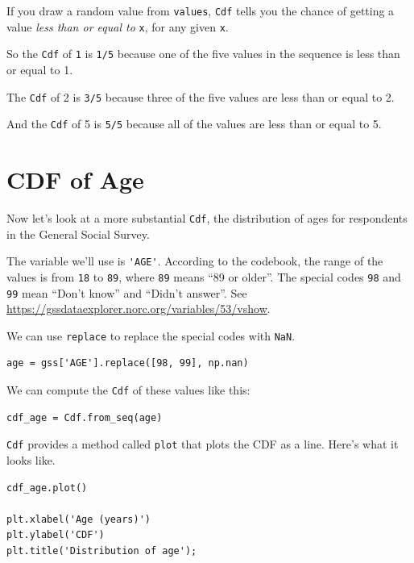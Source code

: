 If you draw a random value from \passthrough{\lstinline!values!},
\passthrough{\lstinline!Cdf!} tells you the chance of getting a value
\emph{less than or equal to} \passthrough{\lstinline!x!}, for any given
\passthrough{\lstinline!x!}.

So the \passthrough{\lstinline!Cdf!} of \passthrough{\lstinline!1!} is
\passthrough{\lstinline!1/5!} because one of the five values in the
sequence is less than or equal to 1.

The \passthrough{\lstinline!Cdf!} of 2 is \passthrough{\lstinline!3/5!}
because three of the five values are less than or equal to 2.

And the \passthrough{\lstinline!Cdf!} of 5 is
\passthrough{\lstinline!5/5!} because all of the values are less than or
equal to 5.

\hypertarget{cdf-of-age}{%
\section{CDF of Age}\label{cdf-of-age}}

Now let's look at a more substantial \passthrough{\lstinline!Cdf!}, the
distribution of ages for respondents in the General Social Survey.

The variable we'll use is \passthrough{\lstinline!'AGE'!}. According to
the codebook, the range of the values is from
\passthrough{\lstinline!18!} to \passthrough{\lstinline!89!}, where
\passthrough{\lstinline!89!} means ``89 or older''. The special codes
\passthrough{\lstinline!98!} and \passthrough{\lstinline!99!} mean
``Don't know'' and ``Didn't answer''. See
\url{https://gssdataexplorer.norc.org/variables/53/vshow}.

We can use \passthrough{\lstinline!replace!} to replace the special
codes with \passthrough{\lstinline!NaN!}.

\begin{lstlisting}[]
age = gss['AGE'].replace([98, 99], np.nan)
\end{lstlisting}

We can compute the \passthrough{\lstinline!Cdf!} of these values like
this:

\begin{lstlisting}[]
cdf_age = Cdf.from_seq(age)
\end{lstlisting}

\passthrough{\lstinline!Cdf!} provides a method called
\passthrough{\lstinline!plot!} that plots the CDF as a line. Here's what
it looks like.

\begin{lstlisting}[]
cdf_age.plot()

plt.xlabel('Age (years)')
plt.ylabel('CDF')
plt.title('Distribution of age');
\end{lstlisting}

